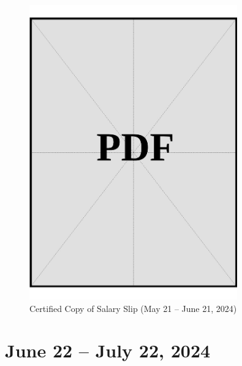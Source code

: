 \begin{figure}[h]
    \centering
    \includegraphics[page=1, width=0.8\textwidth]{../application-docs/applicant/funds/salary-slips/month-1/certified-copies.pdf}
    \caption{Certified Copy of Salary Slip (May 21 – June 21, 2024)}
    \label{fig:month-1-certified}
\end{figure}

\vspace*{\fill}
\clearpage

\section*{June 22 – July 22, 2024}

